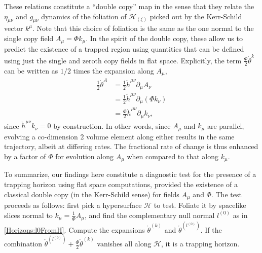 These relations constitute a ``double copy'' map in the sense that they relate the $\eta_{\mu \nu}$ and $g_{\mu \nu}$
dynamics of the foliation of $\mathcal{H}_{(\xi)}$ picked out by the Kerr-Schild vector $k^{\mu}$. Note that this
choice of foliation is the same as the one normal to the single copy field $A_{\mu} = \Phi k_{\mu}$. In the
spirit of the double copy, these allow us to predict the existence of a trapped region using quantities
that can be defined using just the single and zeroth copy fields in flat space. Explicitly, the
term $\frac{\Phi}{2} \mathring{\theta}^{k}$ can be written as $1 / 2$ times the expansion along
$A_{\mu}$,
\begin{equation}  
    \begin{split}
        \frac{1}{2}\mathring{\theta}^{A} &= \frac{1}{2} \mathring{h}^{\mu \nu} \partial_{\mu}A_{\nu} \\
                                         &= \frac{1}{2} \mathring{h}^{\mu \nu} \partial_{\mu} \left(\Phi
                                         k_{\nu}\right) \\
                                         &= \frac{\Phi}{2} \mathring{h}^{\mu \nu} \partial_{\mu} k_{\nu},
    \end{split}
\end{equation}
since $\mathring{h}^{\mu \nu} k_{\nu} = 0$ by construction. In other words, since $A_{\mu}$ and $k_{\mu}$ are
parallel, evolving a co-dimension 2 volume element along either results in the same trajectory, albeit at differing
rates. The fractional rate of change is thus enhanced by a factor of $\Phi$ for evolution along $A_{\mu}$ when
compared to that along $k_{\mu}$.

To summarize, our findings here constitute a diagnostic test for the presence of a trapping horizon using flat
space computations, provided the existence of a classical double copy (in the Kerr-Schild sense) for fields
$A_{\mu}$ and $\Phi$. The test proceeds as follows: first pick a hypersurface $\mathcal{H}$ to test. Foliate it by
spacelike slices normal to $k_{\mu} = \frac{1}{\Phi} A_{\mu}$, and find the complementary null normal $l^{(0)}$ as
in \eqref{Horizons:l0FromH}. Compute the expansions $\mathring{\theta}^{(k)}$ and $\mathring{\theta}^{(l^{(0)})}$. If the
combination $\mathring{\theta}^{(l^{(0)})} + \frac{\Phi}{2} \mathring{\theta}^{(k)}$ vanishes all along
$\mathcal{H}$, it is a trapping horizon.

